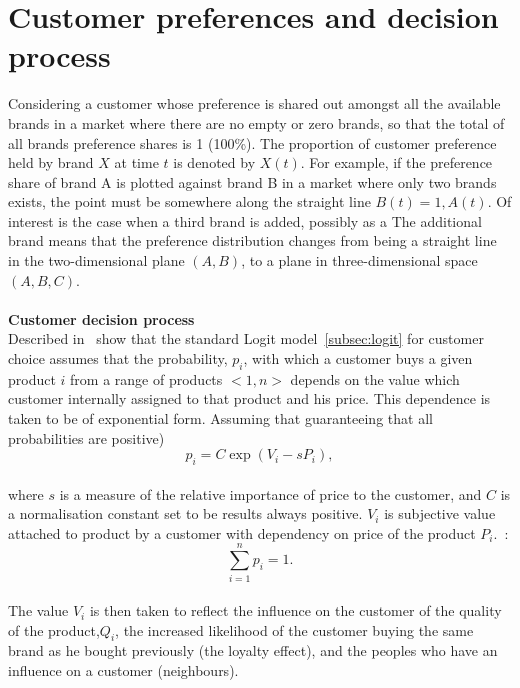 \section{Customer preferences and decision process} \label{sec:customer_preferences}
Considering a customer whose preference is shared out amongst all the available brands in a market where there are no empty or zero brands,
so that the total of all brands preference shares is 1 (100\%).
The proportion of customer preference held by brand $X$ at time $t$ is denoted by $X(t)$.
For example, if the preference share of brand A is plotted against brand B in a market where only two brands exists,
the point must be somewhere along the straight line $B(t) = 1, A(t)$.
Of interest is the case when a third brand is added, possibly as a
The additional brand means that the preference distribution changes from being a straight line in the two-dimensional plane $(A, B)$,
to a plane in three-dimensional space $(A, B, C)$.\\
\\
\textbf{Customer decision process} \label{sec:cus_decision}\\
Described in~\cite{patel} show that the standard Logit model~\ref{subsec:logit} for customer choice assumes that
the probability, $p_i$, with which a customer buys a given product $i$ from a range of products $<1, n>$ depends on
the value which customer internally assigned to that product and his price.
This dependence is taken to be of exponential form.
Assuming that guaranteeing that all probabilities are positive)
\\
\begin{equation} \label{eq:7}
p_i = C\exp(V_i - sP_i),
\end{equation}
\\
where $s$ is a measure of the relative importance of price to the customer, and $C$ is a normalisation constant set to be results always positive. $V_i$ is subjective value
attached to product by a customer with dependency on price of the product $P_i$.~\cite{patel}:
\\
\begin{equation} \label{eq:8}
\sum_{i=1}^n p_i = 1.
\end{equation}
\\
The value $V_i$ is then taken to reflect the influence on the customer of the quality of the product,$Q_i$,
the increased likelihood of the customer buying the same brand as he bought previously (the loyalty effect),
and the peoples who have an influence on a customer (neighbours).
